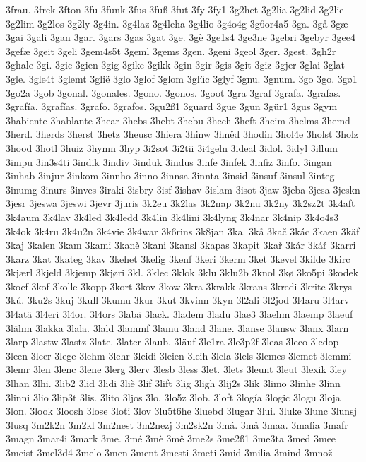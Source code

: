 3frau.
3frek
3fton
3fu
3funk
3fus
3fuß
3fut
3fy
3fy1
3g2het
3g2lia
3g2lid
3g2lie
3g2lim
3g2los
3g2ly
3g4in.
3g4laz
3g4leha
3g4lio
3g4o4g
3g6or4a5
3ga.
3gå
3gæ
3gai
3gali
3gan
3gar.
3gars
3gas
3gat
3ge.
3gè
3ge1s4
3ge3ne
3gebri
3gebyr
3gee4
3gefæ
3geit
3geli
3gem4s5t
3geml
3gems
3gen.
3geni
3geol
3ger.
3gest.
3gh2r
3ghale
3gi.
3gic
3gien
3gig
3gike
3gikk
3gin
3gir
3gis
3git
3giz
3gjer
3glai
3glat
3gle.
3gle4t
3glemt
3glië
3glo
3glof
3glom
3glüc
3glyf
3gnu.
3gnum.
3go
3go.
3gø1
3go2a
3gob
3gonal.
3gonales.
3gono.
3gonos.
3goot
3gra
3graf
3grafa.
3grafas.
3grafía.
3grafías.
3grafo.
3grafos.
3gu2ß1
3guard
3gue
3gun
3gür1
3gus
3gym
3habiente
3hablante
3hear
3hebs
3hebt
3hebu
3hech
3heft
3heim
3helms
3hemd
3herd.
3herds
3herst
3hetz
3heusc
3hiera
3hinw
3hněd
3hodin
3hol4e
3holst
3holz
3hood
3hotl
3huiz
3hymn
3hyp
3i2sot
3i2tii
3i4geln
3ideal
3idol.
3idyl
3illum
3impu
3in3s4ti
3indik
3indiv
3induk
3indus
3infe
3infek
3infiz
3info.
3ingan
3inhab
3injur
3inkom
3innho
3inno
3innsa
3innta
3insid
3insuf
3insul
3integ
3inumg
3inurs
3inves
3iraki
3isbry
3isf
3ishav
3islam
3isot
3jaw
3jeba
3jesa
3jeskn
3jesr
3jeswa
3jeswi
3jevr
3juris
3k2eu
3k2las
3k2nap
3k2nu
3k2ny
3k2sz2t
3k4aft
3k4aum
3k4lav
3k4led
3k4ledd
3k4lin
3k4lini
3k4lyng
3k4nar
3k4nip
3k4o4s3
3k4ok
3k4ru
3k4u2n
3k4vie
3k4war
3k6rins
3k8jan
3ka.
3kå
3kač
3kác
3kaen
3käf
3kaj
3kalen
3kam
3kami
3kaně
3kani
3kansl
3kapas
3kapit
3kař
3kár
3kář
3karri
3karz
3kat
3kateg
3kav
3kehet
3kelig
3kenf
3keri
3kerm
3ket
3kevel
3kilde
3kirc
3kjærl
3kjeld
3kjemp
3kjøri
3kl.
3klec
3klok
3klu
3klu2b
3knol
3kø
3ko5pi
3kodek
3koef
3kof
3kolle
3kopp
3kort
3kov
3kow
3kra
3krakk
3krans
3kredi
3krite
3krys
3ků.
3ku2s
3kuj
3kull
3kumu
3kur
3kut
3kvinn
3kyn
3l2ali
3l2jod
3l4aru
3l4arv
3l4atä
3l4eri
3l4or.
3l4ors
3labä
3lack.
3ladem
3ladu
3lae3
3laehm
3laemp
3laeuf
3lähm
3lakka
3lala.
3lald
3lammf
3lamu
3land
3lane.
3lanse
3lansw
3lanx
3larn
3larp
3lastw
3lastz
3late.
3later
3laub.
3läuf
3le1ra
3le3p2f
3leas
3leco
3ledop
3leen
3leer
3lege
3lehm
3lehr
3leidi
3leien
3leih
3lela
3lels
3lemes
3lemet
3lemmi
3lemr
3len
3lenc
3lene
3lerg
3lerv
3lesb
3less
3let.
3lets
3leunt
3leut
3lexik
3ley
3lhan
3lhi.
3lib2
3lid
3lidi
3liè
3lif
3lift
3lig
3ligh
3lij2s
3lik
3limo
3linhe
3linn
3linni
3lio
3lip3t
3lis.
3lito
3ljos
3lo.
3lo5z
3lob.
3loft
3logía
3logic
3logu
3loja
3lon.
3look
3loosh
3lose
3loti
3lov
3lu5t6he
3luebd
3lugar
3lui.
3luke
3lunc
3lunsj
3lusq
3m2k2n
3m2kl
3m2nest
3m2nezj
3m2sk2n
3má.
3må
3maa.
3mafia
3mafr
3magn
3mar4i
3mark
3me.
3mé
3mè
3mê
3me2s
3me2ß1
3me3ta
3med
3mee
3meist
3mel3d4
3melo
3men
3ment
3mesti
3meti
3mid
3milia
3mind
3množ
